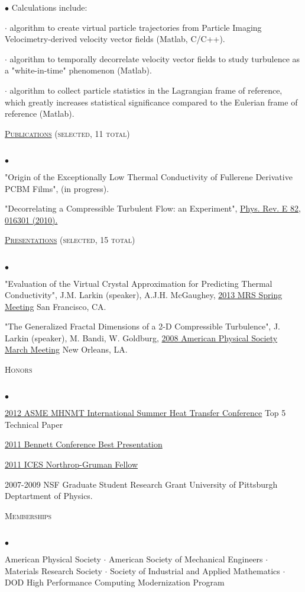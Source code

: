 \documentclass{article}
\newcommand{\lineunder}{\vspace*{-8pt} \\ \hspace*{-18pt} \hrulefill \\}
\newcommand{\header}[1]{{\hspace*{-15pt}\vspace*{6pt} \textsc{#1}} \vspace*{-6pt} \lineunder}
\newenvironment{achievements}{\begin{list}{$\bullet$}{\topsep 0pt \itemsep -2pt}}{\vspace*{4pt}\end{list}}
\begin{document}
\begin{achievements}
Calculations include:

$\cdot$ algorithm to create virtual particle trajectories from Particle Imaging Velocimetry-derived velocity vector fields (Matlab, C/C++).

$\cdot$ algorithm to temporally decorrelate velocity vector fields to study 
turbulence as a "white-in-time" phenomenon (Matlab). 

$\cdot$ algorithm to collect particle statistics in the Lagrangian frame of 
reference, which greatly increases statistical significance compared to the 
Eulerian frame of reference (Matlab). 

\end{achievements}

\header{\href{http://jasonlarkin.github.io/pub.html}{Publications} (selected, 11 total)}
\begin{achievements}
\item "Origin of the Exceptionally Low Thermal Conductivity of Fullerene Derivative  PCBM Films", (in progress).
\item "Decorrelating a Compressible Turbulent Flow: an Experiment", \href{http://pre.aps.org/abstract/PRE/v82/i1/e016301}{Phys. Rev. E 82, 016301 (2010).}
\end{achievements}

\header{\href{http://jasonlarkin.github.io/pres.html}{Presentations} (selected, 15 total)}
\begin{achievements}
\item "Evaluation of the Virtual Crystal Approximation for Predicting Thermal Conductivity", J.M. Larkin (speaker), A.J.H.
   McGaughey, \href{http://www.mrs.org/spring2013/}{2013 MRS Spring Meeting} San Francisco, CA.
\item "The Generalized Fractal Dimensions of a 2-D Compressible Turbulence", J. Larkin (speaker), M. Bandi, W. Goldburg, \href{http://meetings.aps.org/Meeting/MAR08/Content/1017}{2008 American Physical Society March Meeting} New Orleans, LA.
\end{achievements}


\header{Honors}
\begin{achievements}
\item \href{http://www.asmeconferences.org/HT2012/}{2012 ASME MHNMT International Summer Heat Transfer Conference} Top 5 Technical Paper
\item \href{http://www.cmu.edu/me/news/archive/2011/bennett-conference.html}{2011 Bennett Conference Best Presentation}
\item \href{http://www.ices.cmu.edu/newsitem.asp?NewsID=749}{2011 ICES Northrop-Gruman Fellow}
\item 2007-2009 NSF Graduate Student Research Grant University of Pittsburgh Deptartment of Physics.
\end{achievements}

\header{Memberships}
\begin{achievements}
\item American Physical Society $\cdot$ American Society of Mechanical Engineers 
$\cdot$ Materials Research Society $\cdot$ Society of Industrial and Applied Mathematics $\cdot$ DOD High Performance Computing Modernization Program
\end{achievements}
\end{document}
